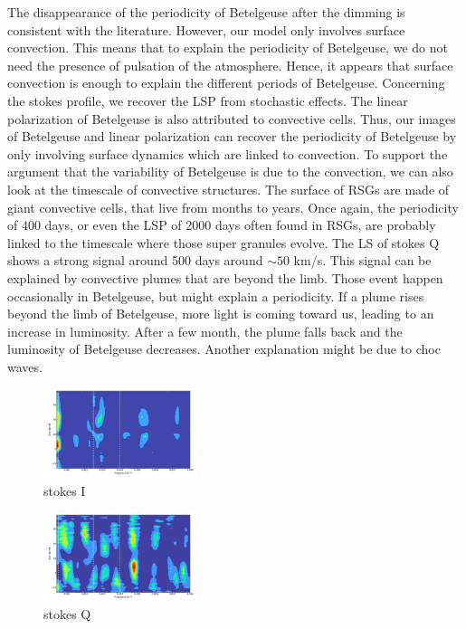 \documentclass{aa}
\begin{document}
The disappearance of the periodicity of Betelgeuse after the dimming is consistent with the literature. However, our model only involves surface convection. This means that to explain the periodicity of Betelgeuse, we do not need the presence of pulsation of the atmosphere. Hence, it appears that surface convection is enough to explain the different periods of Betelgeuse. Concerning the stokes profile, we recover the LSP from stochastic effects. The linear polarization of Betelgeuse is also attributed to convective cells. Thus, our images of Betelgeuse and linear polarization can recover the periodicity of Betelgeuse by only involving surface dynamics which are linked to convection. To support the argument that the variability of Betelgeuse is due to the convection, we can also look at the timescale of convective structures. The surface of RSGs are made of giant convective cells, that live from months to years. Once again, the periodicity of $400$ days, or even the LSP of 2000 days often found in RSGs, are probably linked to the timescale where those super granules evolve. The LS of stokes Q shows a strong signal around 500 days around $\sim 50$ km/s. This signal can be explained by convective plumes that are beyond the limb. Those event happen occasionally in Betelgeuse, but might explain a periodicity. If a plume rises beyond the limb of Betelgeuse, more light is coming toward us, leading to an increase in luminosity. After a few month, the plume falls back and the luminosity of Betelgeuse decreases. Another explanation might be due to choc waves.


\begin{figure}
    \centering
    \includegraphics[width=0.4\textwidth]{LS Intensity.png}
    \caption{stokes I}
    \label{LS Intensity}
\end{figure}
\begin{figure}
    \centering
    \includegraphics[width=0.4\textwidth]{LS stokes Q.png}
    \caption{stokes Q}
    \label{LS Q}
\end{figure}
\end{document}

